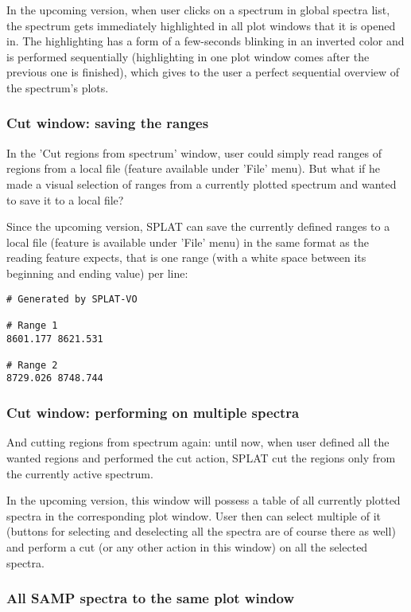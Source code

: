 \documentclass[final,authoryear,5p,times,twocolumn]{elsarticle}
\begin{document}
In the upcoming version, when user clicks on a spectrum in global
spectra list, the spectrum gets immediately highlighted in all plot
windows that it is opened in. The highlighting has a form of a
few-seconds blinking in an inverted color and is performed
sequentially (highlighting in one plot window comes after the previous
one is finished), which gives to the user a perfect sequential
overview of the spectrum's plots.

\subsubsection{Cut window: saving the ranges}

In the 'Cut regions from spectrum' window, user could simply read
ranges of regions from a local file (feature available under 'File'
menu). But what if he made a visual selection of ranges from a
currently plotted spectrum and wanted to save it to a local file?

Since the upcoming version, SPLAT can save the currently defined
ranges to a local file (feature is available under 'File' menu) in the
same format as the reading feature expects, that is one range (with a
white space between its beginning and ending value) per line:

\begin{verbatim}
# Generated by SPLAT-VO

# Range 1
8601.177 8621.531

# Range 2
8729.026 8748.744
\end{verbatim}

\subsubsection{Cut window: performing on multiple spectra}

And cutting regions from spectrum again: until now, when user defined
all the wanted regions and performed the cut action, SPLAT cut the
regions only from the currently active spectrum.

In the upcoming version, this window will possess a table of all
currently plotted spectra in the corresponding plot window. User then
can select multiple of it (buttons for selecting and deselecting all
the spectra are of course there as well) and perform a cut (or any
other action in this window) on all the selected spectra.

\subsubsection{All SAMP spectra to the same plot window}
\end{document}
